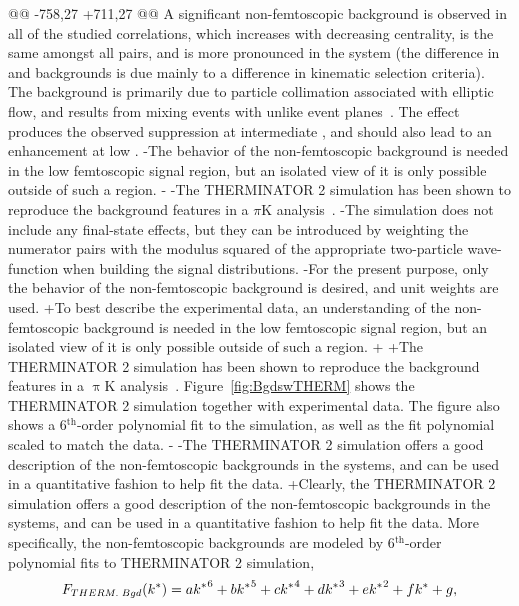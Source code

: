 \begin{table}[htbp]
 
@@ -758,27 +711,27 @@
 A significant non-femtoscopic background is observed in all of the studied \LamK correlations, which increases with decreasing centrality, is the same amongst all \LamKpm pairs, and is more pronounced in the \LamKs system (the difference in \LamKpm and \LamKs backgrounds is due mainly to a difference in kinematic selection criteria).  
 The background is primarily due to particle collimation associated with elliptic flow, and results from mixing events with unlike event planes~\cite{Kisiel:2017}.
 The effect produces the observed suppression at intermediate \kstar, and should also lead to an enhancement at low \kstar.
-The behavior of the non-femtoscopic background is needed in the low \kstar femtoscopic signal region, but an isolated view of it is only possible outside of such a region.
-
-The THERMINATOR 2 simulation has been shown to reproduce the background features in a $\pi$K analysis~\cite{Kisiel:2017}. 
-The simulation does not include any final-state effects, but they can be introduced by weighting the numerator pairs with the modulus squared of the appropriate two-particle wave-function when building the signal distributions. 
-For the present purpose, only the behavior of the non-femtoscopic background is desired, and unit weights are used.
+To best describe the experimental data, an understanding of the non-femtoscopic background is needed in the low \kstar femtoscopic signal region, but an isolated view of it is only possible outside of such a region.
+
+The THERMINATOR 2 simulation has been shown to reproduce the background features in a $\uppi$K analysis~\cite{Kisiel:2017}. 
 Figure~\ref{fig:BgdswTHERM} shows the THERMINATOR 2 simulation together with experimental data.  
 The figure also shows a 6$^{\mathrm{th}}$-order polynomial fit to the simulation, as well as the fit polynomial scaled to match the data.
-
-The THERMINATOR 2 simulation offers a good description of the non-femtoscopic backgrounds in the \LamK systems, and can be used in a quantitative fashion to help fit the data.
+Clearly, the THERMINATOR 2 simulation offers a good description of the non-femtoscopic backgrounds in the \LamK systems, and can be used in a quantitative fashion to help fit the data.
 More specifically, the non-femtoscopic backgrounds are modeled by 6$^{\mathrm{th}}$-order polynomial fits to THERMINATOR 2 simulation,
 \begin{equation}
 F_{\scaleto{THERM.\; Bgd}{6pt}}(k^{*}) = a{k^{*}}^{6}+ b{k^{*}}^{5} + c{k^{*}}^{4} + d{k^{*}}^{3} + e{k^{*}}^{2} + fk^{*} + g,

\end{equation}
\end{table}
